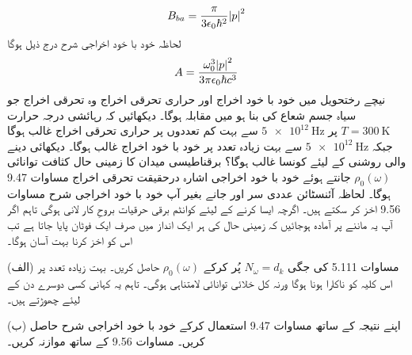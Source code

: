 \documentclass[leqno, b5paper]{khalid-urdu-book}
\begin{document}
\begin{align}
	B_{ba} = \frac{\pi}{3\epsilon_0\hbar^2}\abs{p}^2
\end{align}
لحاظہ خود با خود اخراجی شرح درج ذیل ہوگا
\begin{align}
	A = \frac{\omega^3_0\abs{p}^2}{3\pi\epsilon_0\hbar c^3}
\end{align}
نیچے رختحویل میں خود با خود اخراج اور حراری تحرقی اخراج وہ تحرقی اخراج جو سیاہ جسم شعاع کی بنا ہو میں مقابلہ ہوگا۔ دیکھائیں کہ رہائشی درجہ حرارت \(T = \SI{300}{\kelvin}\) پر \(\SI{5e12}{\hertz}\) سے بہت کم تعددوں پر حراری تحرقی اخراج غالب ہوگا جبکہ \(\SI{5e12}{\hertz}\) سے بہت زیادہ تعدد پر خود با خود اخراج غالب ہوگا۔ دیکھائی دینے والی روشنی کے لیئے کونسا غالب ہوگا؟
برقناطیسی میدان کا زمینی حال کثافت توانائی \(\rho_0(\omega)\) جانتے ہوئے خود با خود اخراجی اشارہ درحقیقت تحرقی اخراج مساوات \num{9.47} ہوگا۔ لحاظہ آئنسٹائن عددی سر  اور  جانے بغیر آپ خود با خود اخراجی شرح مساوات \num{9.56} اخز کر سکتے ہیں۔ اگرچہ ایسا کرنے کے لیئے کوانٹم برقی حرقیات بروحِ کار لانی ہوگی تاہم اگر آپ یہ ماننے پر آمادہ ہوجائیں کہ زمینی حال کی ہر ایک انداز میں صرف ایک فوٹان پایا جاتا ہے تب اس کو اخز کرنا بہت آسان ہوگا۔

(الف) مساوات \num{5.111} کی جگی \(N_\omega = d_k\) پُر کرکے \(\rho_0(\omega)\) حاصل کریں۔ بہت زیادہ تعدد پر اس کلیہ کو ناکارا ہونا ہوگا ورنہ کل خلائی توانائی لامتناہی ہوگی۔ تاہم یہ کہانی کسی دوسرے دن کے لیئے چھوڑتے ہیں۔

(ب) اپنے نتیجہ کے ساتھ مساوات \num{9.47} استعمال کرکے خود با خود اخراجی شرح حاصل کریں۔ مساوات \num{9.56} کے ساتھ موازنہ کریں۔
\end{document}
